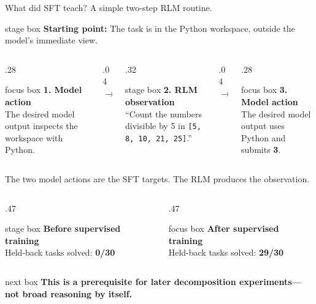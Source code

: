 \documentclass[aspectratio=169,11pt]{beamer}
\newcommand{\rlmstagebox}[1]{%
  \begin{beamercolorbox}[wd=\linewidth,sep=.55em,center,rounded=true]{stage box}
    #1
  \end{beamercolorbox}%
}
\newcommand{\rlmfocusbox}[1]{%
  \begin{beamercolorbox}[wd=\linewidth,sep=.55em,center,rounded=true]{focus box}
    #1
  \end{beamercolorbox}%
}
\newcommand{\rlmnextbox}[1]{%
  \begin{beamercolorbox}[wd=\linewidth,sep=.55em,center,rounded=true]{next box}
    #1
  \end{beamercolorbox}%
}
\begin{document}
\begin{frame}{What did SFT teach? A simple two-step RLM routine.}
  \rlmstagebox{\small\textbf{Starting point:} The task is in the Python workspace, outside the
    model's immediate view.}

  \vspace{.12cm}
  \begin{columns}[c,onlytextwidth]
    \begin{column}{.28\textwidth}
      \rlmfocusbox{\textbf{1. Model action}\\[.12em]
        \footnotesize The desired model output inspects the workspace with Python.}
    \end{column}
    \begin{column}{.04\textwidth}
      \centering\Large\color{RlmTeal}$\rightarrow$
    \end{column}
    \begin{column}{.32\textwidth}
      \rlmstagebox{\textbf{2. RLM observation}\\[.12em]
        \footnotesize ``Count the numbers divisible by 5 in
        \texttt{[5, 8, 10, 21, 25]}.''}
    \end{column}
    \begin{column}{.04\textwidth}
      \centering\Large\color{RlmTeal}$\rightarrow$
    \end{column}
    \begin{column}{.28\textwidth}
      \rlmfocusbox{\textbf{3. Model action}\\[.12em]
        \footnotesize The desired model output uses Python and submits \textbf{3}.}
    \end{column}
  \end{columns}

  \vspace{.04cm}
  \centering
  {\small The two model actions are the SFT targets. The RLM produces the observation.\par}

  \vspace{.10cm}
  \begin{columns}[T,onlytextwidth]
    \begin{column}{.47\textwidth}
      \rlmstagebox{\textbf{Before supervised training}\\[.25em]
        \small Held-back tasks solved: \textbf{0/30}}
    \end{column}
    \begin{column}{.47\textwidth}
      \rlmfocusbox{\textbf{After supervised training}\\[.25em]
        \small Held-back tasks solved: \textbf{29/30}}
    \end{column}
  \end{columns}

  \vspace{.06cm}
  \rlmnextbox{\textbf{This is a prerequisite for later decomposition experiments---not broad
    reasoning by itself.}}
\end{frame}
\end{document}
